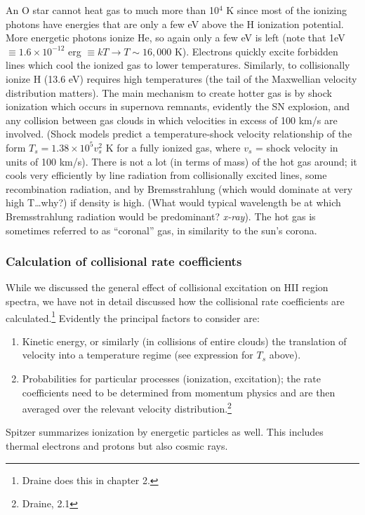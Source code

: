 \documentclass[11pt]{article}
\newcommand{\mar}[1]{\hspace{0pt}\marginpar{-\textcolor{black}{#1}-}}
\newcommand{\mynotes}[1]{{\fontfamily{cmss}\selectfont \textit{#1}}}
\begin{document}
An O star cannot heat gas to much more than 10$^{4}$ K since most of the
ionizing photons have energies that are only a few eV above the H ionization
potential. More energetic photons ionize He, so again only a few eV is left
(note that 1eV
$\equiv 1.6 \times 10^{-12}$ erg $\equiv kT \rightarrow T \sim 16,000$ K).
Electrons quickly excite forbidden lines which cool the ionized gas to
lower temperatures. Similarly, to collisionally ionize H (13.6 eV) requires
high temperatures (the tail of the Maxwellian velocity distribution
matters). The main mechanism to create hotter gas is by shock ionization
which occurs in supernova remnants, evidently the SN explosion, and any
collision between gas clouds in which velocities \mar{143}in excess of 100
km/s are involved. (Shock models predict a temperature-shock velocity
relationship of the form $T_{s} = 1.38 \times 10^{5} v_{s}^{2}$ K for a
fully ionized gas, where $v_{s}$ = shock velocity in units of 100 km/s).
There is not a lot (in terms of mass) of the hot gas around; it cools very
efficiently by line radiation from collisionally excited lines, some
recombination radiation, and by Bremsstrahlung (which would dominate at
very high T\ldots why?) if density is high.
(What would typical wavelength be at which Bremsstrahlung radiation would
be predominant? \mynotes{x-ray}).
The hot gas is sometimes
referred to as ``coronal'' gas, in similarity to the sun's corona.

\subsubsection{Calculation of collisional rate coefficients}
While we discussed the general effect of collisional excitation on HII
region spectra, we have not in detail discussed how the collisional rate
coefficients are calculated.\footnote{Draine does this in chapter 2.}
Evidently the principal factors to consider are:
\begin{enumerate}
    \item Kinetic energy, or similarly (in collisions of entire clouds) the
        translation of velocity into a temperature regime (see expression
        for $T_{s}$ above).
    \item Probabilities for particular processes (ionization, excitation);
        the rate coefficients need to be determined from momentum physics
        and are then averaged over the relevant velocity
        distribution.\footnote{Draine, 2.1}
\end{enumerate}
Spitzer summarizes ionization by energetic particles as well. This includes
thermal electrons and protons but also cosmic rays.
\end{document}
